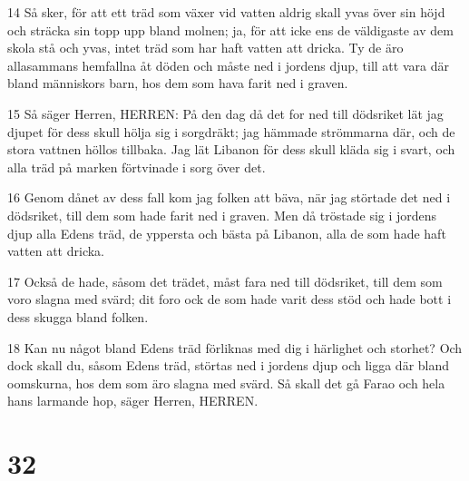 \par 14 Så sker, för att ett träd som växer vid vatten aldrig skall yvas över sin höjd och sträcka sin topp upp bland molnen; ja, för att icke ens de väldigaste av dem skola stå och yvas, intet träd som har haft vatten att dricka. Ty de äro allasammans hemfallna åt döden och måste ned i jordens djup, till att vara där bland människors barn, hos dem som hava farit ned i graven.
\par 15 Så säger Herren, HERREN: På den dag då det for ned till dödsriket lät jag djupet för dess skull hölja sig i sorgdräkt; jag hämmade strömmarna där, och de stora vattnen höllos tillbaka. Jag lät Libanon för dess skull kläda sig i svart, och alla träd på marken förtvinade i sorg över det.
\par 16 Genom dånet av dess fall kom jag folken att bäva, när jag störtade det ned i dödsriket, till dem som hade farit ned i graven. Men då tröstade sig i jordens djup alla Edens träd, de yppersta och bästa på Libanon, alla de som hade haft vatten att dricka.
\par 17 Också de hade, såsom det trädet, måst fara ned till dödsriket, till dem som voro slagna med svärd; dit foro ock de som hade varit dess stöd och hade bott i dess skugga bland folken.
\par 18 Kan nu något bland Edens träd förliknas med dig i härlighet och storhet? Och dock skall du, såsom Edens träd, störtas ned i jordens djup och ligga där bland oomskurna, hos dem som äro slagna med svärd. Så skall det gå Farao och hela hans larmande hop, säger Herren, HERREN.

\chapter{32}

